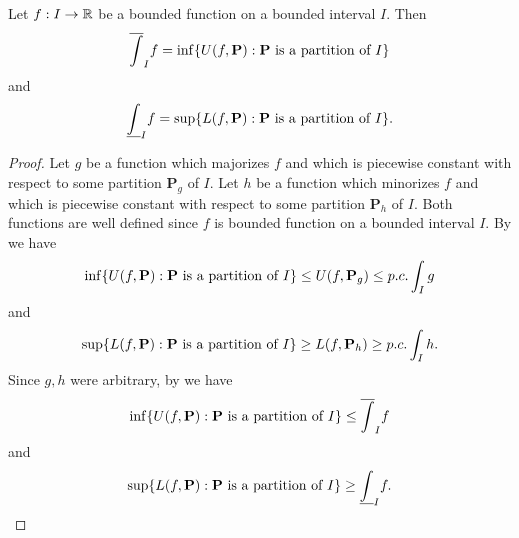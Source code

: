 \begin{prop}\label{i:11.3.12}
  Let \(f : I \to \mathbb{R}\) be a bounded function on a bounded interval \(I\).
  Then
  \[
    \overline{\int}_I f = \inf\set{U(f, \mathbf{P}) : \mathbf{P} \text{ is a partition of } I}
  \]
  and
  \[
    \underline{\int}_I f = \sup\set{L(f, \mathbf{P}) : \mathbf{P} \text{ is a partition of } I}.
  \]
\end{prop}

\begin{proof}
  Let \(g\) be a function which majorizes \(f\) and which is piecewise constant with respect to some partition \(\mathbf{P}_g\) of \(I\).
  Let \(h\) be a function which minorizes \(f\) and which is piecewise constant with respect to some partition \(\mathbf{P}_h\) of \(I\).
  Both functions are well defined since \(f\) is bounded function on a bounded interval \(I\).
  By  we have
  \[
    \inf\set{U(f, \mathbf{P}) : \mathbf{P} \text{ is a partition of } I} \leq U(f, \mathbf{P}_g) \leq p.c. \int_I g
  \]
  and
  \[
    \sup\set{L(f, \mathbf{P}) : \mathbf{P} \text{ is a partition of } I} \geq L(f, \mathbf{P}_h) \geq p.c. \int_I h.
  \]
  Since \(g, h\) were arbitrary, by  we have
  \[
    \inf\set{U(f, \mathbf{P}) : \mathbf{P} \text{ is a partition of } I} \leq \overline{\int}_I f
  \]
  and
  \[
    \sup\set{L(f, \mathbf{P}) : \mathbf{P} \text{ is a partition of } I} \geq \underline{\int}_I f.
  \]


\end{proof}

